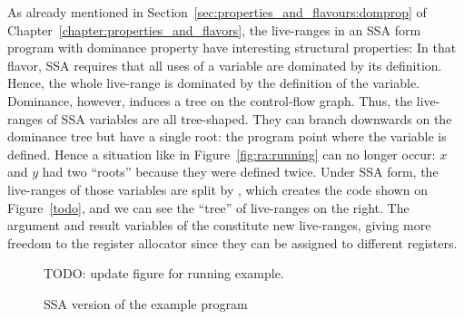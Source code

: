 {

As already mentioned in Section~\ref{sec:properties_and_flavours:domprop} of Chapter~\ref{chapter:properties_and_flavors}, the live-ranges in an SSA form program with dominance property have interesting structural properties:
In that flavor, SSA requires that all uses of a variable are dominated by its definition.
Hence, the whole live-range is dominated by the definition of the variable.
Dominance, however, induces a tree on the control-flow graph.
Thus, the live-ranges of SSA variables are all tree-shaped.
They can branch downwards on the dominance tree but have a single root:
the program point where the variable is defined.
Hence a situation like in Figure~\ref{fig:ra:running} can no longer occur:
$x$ and $y$ had two ``roots'' because they were defined twice.
Under SSA form, the live-ranges of those variables are split by \phifuns, which creates the code shown on Figure~\ref{todo}, and we can see the ``tree'' of live-ranges on the right.
The argument and result variables of the \phifuns constitute new live-ranges, giving more freedom to the register allocator since they can be assigned to different registers.

\begin{figure}[htbp]
  TODO: update figure for running example.
	\begin{center}
		\qquad
	\end{center}
	\caption{SSA version of the example program}
	\label{fig:ra:exprgssa}
\end{figure}

}
